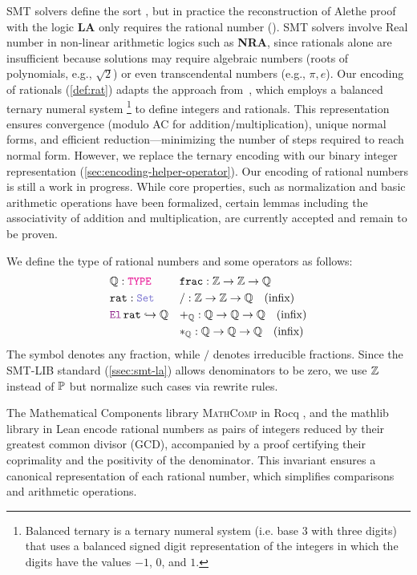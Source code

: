 SMT solvers define the sort , but in practice the reconstruction of Alethe proof with the logic \uppercase{\textbf{LA}} only requires the rational number (\Q).
SMT solvers involve Real number in non-linear arithmetic logics such as \uppercase{\textbf{NRA}}, since rationals alone are insufficient because solutions may require algebraic numbers (roots of polynomials, e.g., $\sqrt{2}$) or even transcendental numbers (e.g., $\pi, e$).
Our encoding of rationals (\cref{def:rat}) adapts the approach from~\cite{frac-rw}, which employs a balanced ternary numeral system
\footnote{Balanced ternary is a ternary numeral system (i.e. base $3$ with three digits) that uses a balanced signed digit representation of the integers in which the digits have the values $-1$, $0$, and $1$.}
to define integers and rationals.
This representation ensures convergence (modulo AC for addition/multiplication), unique normal forms, and efficient reduction—minimizing the number of steps required to reach normal form.
However, we replace the ternary encoding with our binary integer representation (\cref{sec:encoding-helper-operator}).
Our encoding of rational numbers is still a work in progress.
While core properties, such as normalization and basic arithmetic operations have been formalized, certain lemmas including the associativity of addition and multiplication, are currently accepted and remain to be proven.

\begin{definition}[Rational]\label{def:rat}
We define the type of rational numbers and some operators as follows:
\begin{align*}
& \Q: \type            & &\kw{frac}: \Z \ra \Z \ra \Q \\
& \kw{rat}: \set       & &\slash: \Z \ra \Z \ra \Q \quad \text{(infix)} \\
& \el\,\kw{rat} \re \Q & &+_\Q : \Q \ra \Q \ra \Q \quad \text{(infix)}\\
&                      & &*_\Q : \Q \ra \Q \ra \Q \quad \text{(infix)}\\
\end{align*}
The symbol  denotes any fraction, while $\slash$ denotes irreducible fractions.
Since the SMT-LIB standard (\cref{ssec:smt-la}) allows denominators to be zero, we use $\mathbb{Z}$ instead of $\mathbb{P}$ but normalize such cases via rewrite rules.
\end{definition}

The Mathematical Components library \textsc{MathComp} \cite{mathcomp}  in Rocq \cite{Rocq-refman}, and the mathlib library \cite{mathlib} in Lean \cite{lean4:2021} encode rational numbers as pairs of integers reduced by their greatest common divisor (GCD), accompanied by a proof certifying their coprimality and the positivity of the denominator.
This invariant ensures a canonical representation of each rational number, which simplifies comparisons and arithmetic operations.

